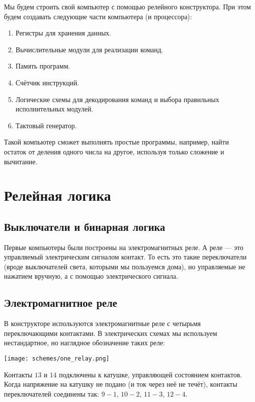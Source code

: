 Мы будем строить свой компьютер с помощью релейного конструктора.
При этом будем создавать следующие части компьютера (и процессора):
\begin{enumerate}
    \item Регистры для хранения данных.
    \item Вычислительные модули для реализации команд.
    \item Память программ.
    \item Счётчик инструкций.
    \item Логические схемы для декодирования команд и выбора правильных исполнительных модулей.
    \item Тактовый генератор.
\end{enumerate}

Такой компьютер сможет выполнять простые программы, например, найти остаток от деления одного числа на другое,
используя только сложение и вычитание.

\chapter{Релейная логика}

\section{Выключатели и бинарная логика}

Первые компьютеры были построены на электромагнитных реле. А реле --- это управляемый электрическим
сигналом контакт. То есть это такие переключатели (вроде выключателей света, которыми мы пользуемся дома),
но управляемые не нажатием вручную, а с помощью электрического сигнала.

\section{Электромагнитное реле}

В конструкторе используются электромагнитные реле с четырьмя
переключающими контактами. В электрических схемах
мы используем нестандартное, но наглядное обозначение таких реле:

\begin{center}
\texttt{[image: schemes/one\_relay.png]}
\end{center}


Контакты $13$ и $14$ подключены к катушке, управляющей состоянием контактов.
Когда напряжение на катушку не подано (и ток через неё не течёт),
контакты переключателей соединены так: $9-1$, $10-2$, $11-3$, $12-4$.

